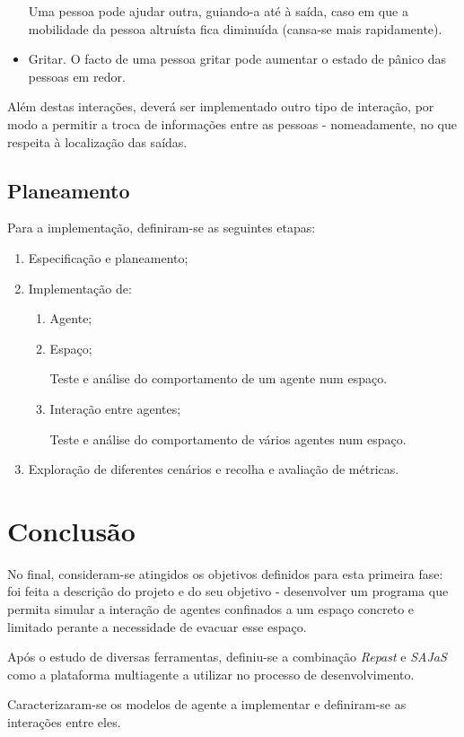 \documentclass[12pt]{article}
\begin{document}
\begin{titlepage}
\begin{itemize}
	Uma pessoa pode ajudar outra, guiando-a até à saída, caso em que a mobilidade da pessoa altruísta fica diminuída (cansa-se mais rapidamente).

\item Gritar.
	O facto de uma pessoa gritar pode aumentar o estado de pânico das pessoas em redor.
\end{itemize}

Além destas interações, deverá ser implementado outro tipo de interação, por modo a permitir a troca de informações entre as pessoas - nomeadamente, no que respeita à localização das saídas.

\subsection{Planeamento}
Para a implementação, definiram-se as seguintes etapas:
\begin{enumerate}
	\item Especificação e planeamento;
	\item Implementação de:
	 \begin{enumerate} 
	 	\item Agente;
	 	\item Espaço;
	 	
	 	Teste e análise do comportamento de um agente num espaço.
		\item Interação entre agentes;
		
		Teste e análise do comportamento de vários agentes num espaço. 
	\end{enumerate}
	\item Exploração de diferentes cenários e recolha e avaliação de métricas.
\end{enumerate}


\section{Conclusão}

No final, consideram-se atingidos os objetivos definidos para esta primeira fase: foi feita a descrição do projeto e do seu objetivo - desenvolver um programa que permita simular a interação de agentes confinados a um espaço concreto e limitado perante a necessidade de evacuar esse espaço.

Após o estudo de diversas ferramentas, definiu-se a combinação \textit{Repast} e \textit{SAJaS} como a plataforma multiagente a utilizar no processo de  desenvolvimento.

Caracterizaram-se os modelos de agente a implementar e definiram-se as interações entre eles.


\end{titlepage}
\end{document}
